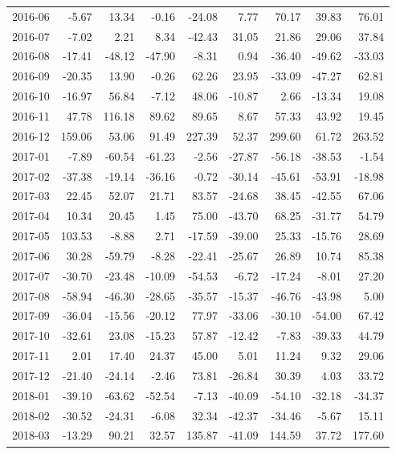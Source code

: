 \begin{table}[ht]
\begin{tabular}{lrrrrrrrr}
  2016-06 & -5.67 & 13.34 & -0.16 & -24.08 & 7.77 & 70.17 & 39.83 & 76.01 \\ 
  2016-07 & -7.02 & 2.21 & 8.34 & -42.43 & 31.05 & 21.86 & 29.06 & 37.84 \\ 
  2016-08 & -17.41 & -48.12 & -47.90 & -8.31 & 0.94 & -36.40 & -49.62 & -33.03 \\ 
  2016-09 & -20.35 & 13.90 & -0.26 & 62.26 & 23.95 & -33.09 & -47.27 & 62.81 \\ 
  2016-10 & -16.97 & 56.84 & -7.12 & 48.06 & -10.87 & 2.66 & -13.34 & 19.08 \\ 
  2016-11 & 47.78 & 116.18 & 89.62 & 89.65 & 8.67 & 57.33 & 43.92 & 19.45 \\ 
  2016-12 & 159.06 & 53.06 & 91.49 & 227.39 & 52.37 & 299.60 & 61.72 & 263.52 \\ 
  2017-01 & -7.89 & -60.54 & -61.23 & -2.56 & -27.87 & -56.18 & -38.53 & -1.54 \\ 
  2017-02 & -37.38 & -19.14 & -36.16 & -0.72 & -30.14 & -45.61 & -53.91 & -18.98 \\ 
  2017-03 & 22.45 & 52.07 & 21.71 & 83.57 & -24.68 & 38.45 & -42.55 & 67.06 \\ 
  2017-04 & 10.34 & 20.45 & 1.45 & 75.00 & -43.70 & 68.25 & -31.77 & 54.79 \\ 
  2017-05 & 103.53 & -8.88 & 2.71 & -17.59 & -39.00 & 25.33 & -15.76 & 28.69 \\ 
  2017-06 & 30.28 & -59.79 & -8.28 & -22.41 & -25.67 & 26.89 & 10.74 & 85.38 \\ 
  2017-07 & -30.70 & -23.48 & -10.09 & -54.53 & -6.72 & -17.24 & -8.01 & 27.20 \\ 
  2017-08 & -58.94 & -46.30 & -28.65 & -35.57 & -15.37 & -46.76 & -43.98 & 5.00 \\ 
  2017-09 & -36.04 & -15.56 & -20.12 & 77.97 & -33.06 & -30.10 & -54.00 & 67.42 \\ 
  2017-10 & -32.61 & 23.08 & -15.23 & 57.87 & -12.42 & -7.83 & -39.33 & 44.79 \\ 
  2017-11 & 2.01 & 17.40 & 24.37 & 45.00 & 5.01 & 11.24 & 9.32 & 29.06 \\ 
  2017-12 & -21.40 & -24.14 & -2.46 & 73.81 & -26.84 & 30.39 & 4.03 & 33.72 \\ 
  2018-01 & -39.10 & -63.62 & -52.54 & -7.13 & -40.09 & -54.10 & -32.18 & -34.37 \\ 
  2018-02 & -30.52 & -24.31 & -6.08 & 32.34 & -42.37 & -34.46 & -5.67 & 15.11 \\ 
  2018-03 & -13.29 & 90.21 & 32.57 & 135.87 & -41.09 & 144.59 & 37.72 & 177.60 \\ 

\end{tabular}
\end{table}
